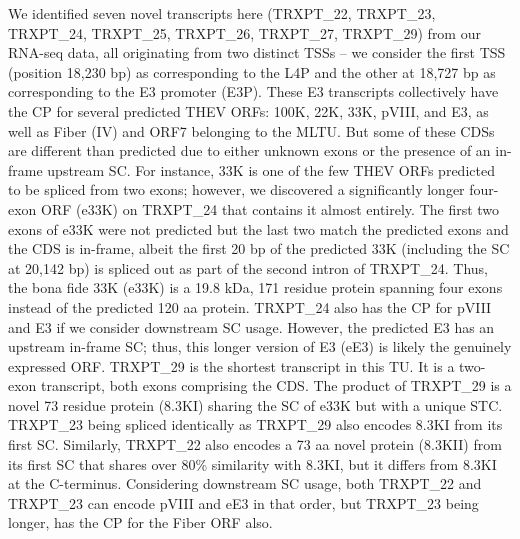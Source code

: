 \documentclass[
]{article}
\begin{document}
We identified seven novel transcripts here (TRXPT\_22, TRXPT\_23,
TRXPT\_24, TRXPT\_25, TRXPT\_26, TRXPT\_27, TRXPT\_29) from our RNA-seq
data, all originating from two distinct TSSs -- we consider the first
TSS (position 18,230 bp) as corresponding to the L4P and the other at
18,727 bp as corresponding to the E3 promoter (E3P). These E3
transcripts collectively have the CP for several predicted THEV ORFs:
100K, 22K, 33K, pVIII, and E3, as well as Fiber (IV) and ORF7 belonging
to the MLTU. But some of these CDSs are different than predicted due to
either unknown exons or the presence of an in-frame upstream SC. For
instance, 33K is one of the few THEV ORFs predicted to be spliced from
two exons; however, we discovered a significantly longer four-exon ORF
(e33K) on TRXPT\_24 that contains it almost entirely. The first two
exons of e33K were not predicted but the last two match the predicted
exons and the CDS is in-frame, albeit the first 20 bp of the predicted
33K (including the SC at 20,142 bp) is spliced out as part of the second
intron of TRXPT\_24. Thus, the bona fide 33K (e33K) is a 19.8 kDa, 171
residue protein spanning four exons instead of the predicted 120 aa
protein. TRXPT\_24 also has the CP for pVIII and E3 if we consider
downstream SC usage. However, the predicted E3 has an upstream in-frame
SC; thus, this longer version of E3 (eE3) is likely the genuinely
expressed ORF. TRXPT\_29 is the shortest transcript in this TU. It is a
two-exon transcript, both exons comprising the CDS. The product of
TRXPT\_29 is a novel 73 residue protein (8.3KI) sharing the SC of e33K
but with a unique STC. TRXPT\_23 being spliced identically as TRXPT\_29
also encodes 8.3KI from its first SC. Similarly, TRXPT\_22 also encodes
a 73 aa novel protein (8.3KII) from its first SC that shares over 80\%
similarity with 8.3KI, but it differs from 8.3KI at the C-terminus.
Considering downstream SC usage, both TRXPT\_22 and TRXPT\_23 can encode
pVIII and eE3 in that order, but TRXPT\_23 being longer, has the CP for
the Fiber ORF also.
\end{document}
